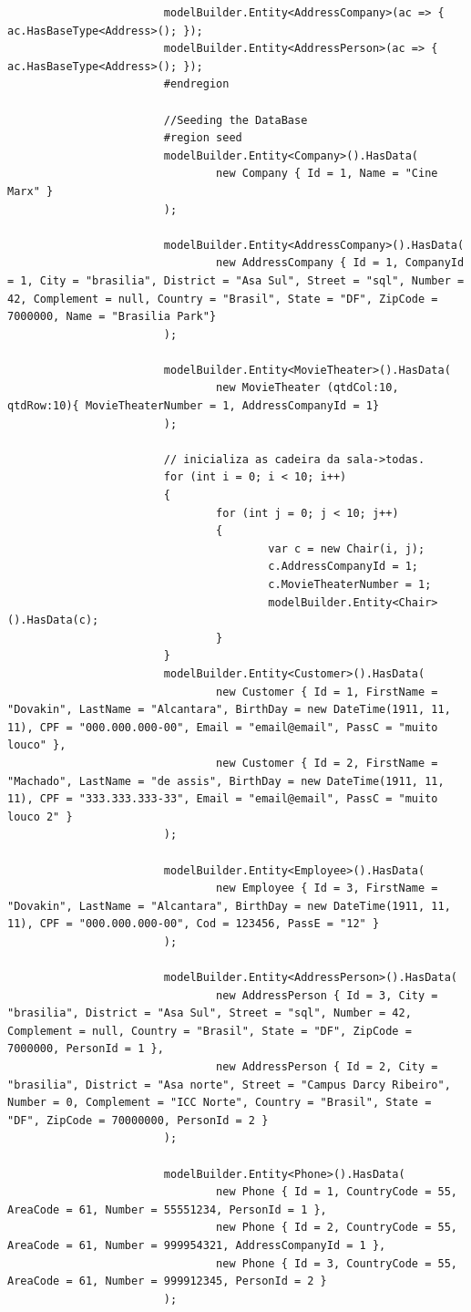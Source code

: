 \documentclass[a4paper,10pt]{article}
\begin{document}
\begin{lstlisting}
						modelBuilder.Entity<AddressCompany>(ac => { ac.HasBaseType<Address>(); });
						modelBuilder.Entity<AddressPerson>(ac => { ac.HasBaseType<Address>(); });
						#endregion

						//Seeding the DataBase
						#region seed
						modelBuilder.Entity<Company>().HasData(
								new Company { Id = 1, Name = "Cine Marx" }
						);

						modelBuilder.Entity<AddressCompany>().HasData(
								new AddressCompany { Id = 1, CompanyId = 1, City = "brasilia", District = "Asa Sul", Street = "sql", Number = 42, Complement = null, Country = "Brasil", State = "DF", ZipCode = 7000000, Name = "Brasilia Park"}
						);

						modelBuilder.Entity<MovieTheater>().HasData(
								new MovieTheater (qtdCol:10, qtdRow:10){ MovieTheaterNumber = 1, AddressCompanyId = 1}
						);

						// inicializa as cadeira da sala->todas.
						for (int i = 0; i < 10; i++)
						{
								for (int j = 0; j < 10; j++)
								{
										var c = new Chair(i, j);
										c.AddressCompanyId = 1;
										c.MovieTheaterNumber = 1;
										modelBuilder.Entity<Chair>().HasData(c);
								}
						}
						modelBuilder.Entity<Customer>().HasData(
								new Customer { Id = 1, FirstName = "Dovakin", LastName = "Alcantara", BirthDay = new DateTime(1911, 11, 11), CPF = "000.000.000-00", Email = "email@email", PassC = "muito louco" },
								new Customer { Id = 2, FirstName = "Machado", LastName = "de assis", BirthDay = new DateTime(1911, 11, 11), CPF = "333.333.333-33", Email = "email@email", PassC = "muito louco 2" }
						);

						modelBuilder.Entity<Employee>().HasData(
								new Employee { Id = 3, FirstName = "Dovakin", LastName = "Alcantara", BirthDay = new DateTime(1911, 11, 11), CPF = "000.000.000-00", Cod = 123456, PassE = "12" }
						);

						modelBuilder.Entity<AddressPerson>().HasData(
								new AddressPerson { Id = 3, City = "brasilia", District = "Asa Sul", Street = "sql", Number = 42, Complement = null, Country = "Brasil", State = "DF", ZipCode = 7000000, PersonId = 1 },
								new AddressPerson { Id = 2, City = "brasilia", District = "Asa norte", Street = "Campus Darcy Ribeiro", Number = 0, Complement = "ICC Norte", Country = "Brasil", State = "DF", ZipCode = 70000000, PersonId = 2 }
						);

						modelBuilder.Entity<Phone>().HasData(
								new Phone { Id = 1, CountryCode = 55, AreaCode = 61, Number = 55551234, PersonId = 1 },
								new Phone { Id = 2, CountryCode = 55, AreaCode = 61, Number = 999954321, AddressCompanyId = 1 },
								new Phone { Id = 3, CountryCode = 55, AreaCode = 61, Number = 999912345, PersonId = 2 }
						);


\end{lstlisting}
\end{document}
